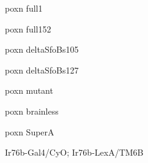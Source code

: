 \documentclass[17pt]{extarticle}
\begin{document}
\bf
{}
\vspace*{\fill}\begin{large}
poxn full1 \\[0.5em]
\end{large}
\footnotesize
\vspace*{\fill}
\newpage{}
\vspace*{\fill}\begin{normalsize}
poxn full152 \\[0.5em]
\end{normalsize}
\footnotesize
\vspace*{\fill}
\newpage{}
\vspace*{\fill}\begin{small}
poxn deltaSfoBs105 \\[0.5em]
\end{small}
\footnotesize
\vspace*{\fill}
\newpage{}
\vspace*{\fill}\begin{small}
poxn deltaSfoBs127 \\[0.5em]
\end{small}
\footnotesize
\vspace*{\fill}
\newpage{}
\vspace*{\fill}\begin{normalsize}
poxn mutant \\[0.5em]
\end{normalsize}
\footnotesize
\vspace*{\fill}
\newpage{}
\vspace*{\fill}\begin{normalsize}
poxn brainless \\[0.5em]
\end{normalsize}
\footnotesize
\vspace*{\fill}
\newpage{}
\vspace*{\fill}\begin{normalsize}
poxn SuperA \\[0.5em]
\end{normalsize}
\footnotesize
\vspace*{\fill}
\newpage{}
\vspace*{\fill}\begin{scriptsize}
Ir76b-Gal4/CyO; Ir76b-LexA/TM6B \\[0.5em]
\end{scriptsize}
\footnotesize
\vspace*{\fill}
\newpage{}
\end{document}
